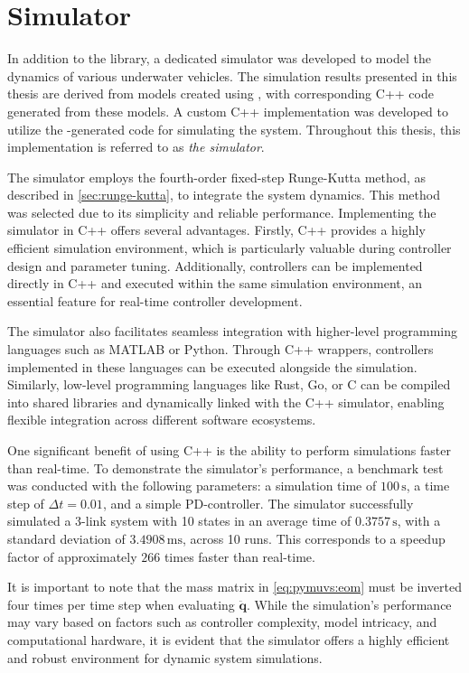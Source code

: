 \section{Simulator}
In addition to the \pymuvs{} library, a dedicated simulator was developed to 
model the dynamics of various underwater vehicles. The simulation results 
presented in this thesis are derived from models created using \pymuvs{}, with 
corresponding C++ code generated from these models. A custom C++ implementation 
was developed to utilize the \pymuvs{}-generated code for simulating the 
system. Throughout this thesis, this implementation is referred to as 
\textit{the simulator}.

The simulator employs the fourth-order fixed-step Runge-Kutta method, as 
described in \autoref{sec:runge-kutta}, to integrate the system dynamics. This 
method was selected due to its simplicity and reliable performance. 
Implementing the simulator in C++ offers several advantages. Firstly, C++ 
provides a highly efficient simulation environment, which is particularly 
valuable during controller design and parameter tuning. Additionally, 
controllers can be implemented directly in C++ and executed within the same 
simulation environment, an essential feature for real-time controller development.

The simulator also facilitates seamless integration with higher-level 
programming languages such as MATLAB or Python. Through C++ wrappers, 
controllers implemented in these languages can be executed alongside the 
simulation. Similarly, low-level programming languages like Rust, Go, or C can 
be compiled into shared libraries and dynamically linked with the C++ 
simulator, enabling flexible integration across different software ecosystems.

One significant benefit of using C++ is the ability to perform simulations 
faster than real-time. To demonstrate the simulator's performance, a benchmark 
test was conducted with the following parameters: a simulation time of $100 \, 
\mathrm{s}$, a time step of $\Delta t = 0.01$, and a simple PD-controller. The 
simulator successfully simulated a 3-link system with 10 states in an average 
time of $0.3757 \, \mathrm{s}$, with a standard deviation of $3.4908 \, 
\mathrm{ms}$, across 10 runs. This corresponds to a speedup factor of 
approximately $266$ times faster than real-time.

It is important to note that the mass matrix in \autoref{eq:pymuvs:eom} must be 
inverted four times per time step when evaluating $\ddot{\bm{q}}$. While the 
simulation's performance may vary based on factors such as controller 
complexity, model intricacy, and computational hardware, it is evident that the 
simulator offers a highly efficient and robust environment for dynamic system 
simulations.

